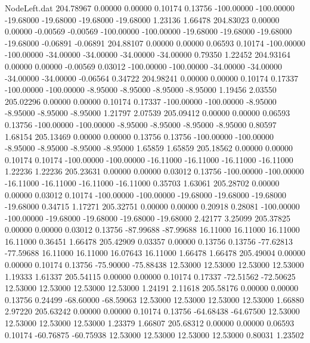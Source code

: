 \begin{filecontents}{NodeLeft.dat}
 204.78967    0.00000    0.00000     0.10174    0.13756 -100.00000 -100.00000  -19.68000  -19.68000  -19.68000  -19.68000    1.23136    1.66478
 204.83023    0.00000    0.00000    -0.00569   -0.00569 -100.00000 -100.00000  -19.68000  -19.68000  -19.68000  -19.68000   -0.06891   -0.06891
 204.88107    0.00000    0.00000     0.06593    0.10174 -100.00000 -100.00000  -34.00000  -34.00000  -34.00000  -34.00000    0.79350    1.22452
 204.93164    0.00000    0.00000    -0.00569    0.03012 -100.00000 -100.00000  -34.00000  -34.00000  -34.00000  -34.00000   -0.06564    0.34722
 204.98241    0.00000    0.00000     0.10174    0.17337 -100.00000 -100.00000   -8.95000   -8.95000   -8.95000   -8.95000    1.19456    2.03550
 205.02296    0.00000    0.00000     0.10174    0.17337 -100.00000 -100.00000   -8.95000   -8.95000   -8.95000   -8.95000    1.21797    2.07539
 205.09412    0.00000    0.00000     0.06593    0.13756 -100.00000 -100.00000   -8.95000   -8.95000   -8.95000   -8.95000    0.80597    1.68154
 205.13469    0.00000    0.00000     0.13756    0.13756 -100.00000 -100.00000   -8.95000   -8.95000   -8.95000   -8.95000    1.65859    1.65859
 205.18562    0.00000    0.00000     0.10174    0.10174 -100.00000 -100.00000  -16.11000  -16.11000  -16.11000  -16.11000    1.22236    1.22236
 205.23631    0.00000    0.00000     0.03012    0.13756 -100.00000 -100.00000  -16.11000  -16.11000  -16.11000  -16.11000    0.35703    1.63061
 205.28702    0.00000    0.00000     0.03012    0.10174 -100.00000 -100.00000  -19.68000  -19.68000  -19.68000  -19.68000    0.34715    1.17271
 205.32751    0.00000    0.00000     0.20918    0.28081 -100.00000 -100.00000  -19.68000  -19.68000  -19.68000  -19.68000    2.42177    3.25099
 205.37825    0.00000    0.00000     0.03012    0.13756  -87.99688  -87.99688   16.11000   16.11000   16.11000   16.11000    0.36451    1.66478
 205.42909    0.03357    0.00000     0.13756    0.13756  -77.62813  -77.59688   16.11000   16.11000   16.07643   16.11000    1.66478    1.66478
 205.49004    0.00000    0.00000     0.10174    0.13756  -75.90000  -75.88438   12.53000   12.53000   12.53000   12.53000    1.19333    1.61337
 205.54115    0.00000    0.00000     0.10174    0.17337  -72.51562  -72.50625   12.53000   12.53000   12.53000   12.53000    1.24191    2.11618
 205.58176    0.00000    0.00000     0.13756    0.24499  -68.60000  -68.59063   12.53000   12.53000   12.53000   12.53000    1.66880    2.97220
 205.63242    0.00000    0.00000     0.10174    0.13756  -64.68438  -64.67500   12.53000   12.53000   12.53000   12.53000    1.23379    1.66807
 205.68312    0.00000    0.00000     0.06593    0.10174  -60.76875  -60.75938   12.53000   12.53000   12.53000   12.53000    0.80031    1.23502

\end{filecontents}

